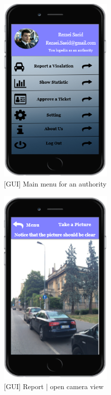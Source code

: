 \begin{figure}[h]
		\centering
      \includegraphics[width=0.5\textwidth]{GUI/MainMenuAuthority.png}
      \caption{[GUI] Main menu for an authority}   \label{fig:MainMenuAuthority}
\end{figure}

\begin{figure}[h]
		\centering
      \includegraphics[width=0.5\textwidth]{GUI/TakePicture.png}
      \caption{[GUI] Report | open camera view}   \label{fig:TakePicture}
\end{figure}


